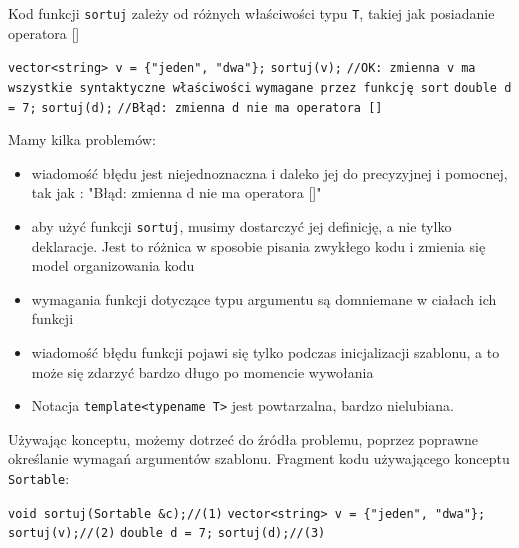 \documentclass[11pt, a4paper]{article}
\begin{document}
Kod funkcji \verb#sortuj# zależy od różnych właściwości typu \verb#T#, takiej jak posiadanie operatora [] \newline

\noindent \verb#vector<string> v = {"jeden", "dwa"};# \newline
\verb#sortuj(v);# \newline
\verb#//OK: zmienna v ma wszystkie syntaktyczne właściwości# \newline
\verb#wymagane przez funkcję sort# \newline\newline
\verb#double d = 7;# \newline
\verb#sortuj(d);# \newline
\verb#//Błąd: zmienna d nie ma operatora []#\newline

\noindent Mamy kilka problemów:\newline
\begin{itemize}

\item wiadomość błędu jest niejednoznaczna i daleko jej do precyzyjnej i pomocnej, tak jak : "Błąd: zmienna d nie ma operatora []"

\item aby użyć funkcji \verb#sortuj#, musimy dostarczyć jej definicję, a nie tylko deklaracje. Jest to różnica w sposobie pisania zwykłego kodu i zmienia się model organizowania kodu

\item wymagania funkcji dotyczące typu argumentu są domniemane w ciałach ich funkcji

\item wiadomość błędu funkcji pojawi się tylko podczas inicjalizacji szablonu, a to może się zdarzyć bardzo długo po momencie wywołania

\item Notacja \verb#template<typename T># jest powtarzalna, bardzo nielubiana.

\end{itemize}

Używając konceptu, możemy dotrzeć do źródła problemu, poprzez poprawne określanie wymagań argumentów szablonu. Fragment kodu używającego konceptu \verb#Sortable#:\newline

\noindent \verb#void sortuj(Sortable &c);//(1)#\newline
\verb#vector<string> v = {"jeden", "dwa"};#\newline
\verb#sortuj(v);//(2)# \newline
\verb#double d = 7;# \newline
\verb#sortuj(d);//(3)# \newline
\end{document}
